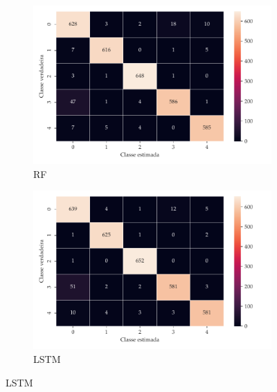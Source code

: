 \documentclass[aspectratio=169]{beamer}
\begin{document}
\begin{frame}
\begin{figure}[H]
\begin{subfigure}[H]{0.325\textwidth}
		\end{subfigure}
		\\
		\centering
		\begin{subfigure}[H]{0.325\textwidth}
			\centering
			\includegraphics[scale=0.25]{rf-confusion-matrix}
			\caption{RF}
		\end{subfigure}
		\centering
		\begin{subfigure}[H]{0.325\textwidth}
			\centering
			\includegraphics[scale=0.25]{lstm-confusion-matrix}
			\caption{LSTM}
		\end{subfigure}
		\centering
	\end{figure}		
	
\end{frame}
\end{document}
